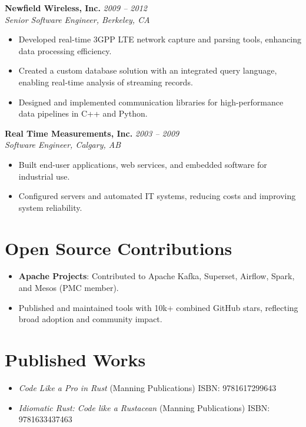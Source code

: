 \documentclass[margin,line]{resume}
\begin{document}
\begin{resume}
\textbf{Newfield Wireless, Inc.} \hfill \textit{2009 -- 2012} \\
\textit{Senior Software Engineer, Berkeley, CA}
\begin{itemize}[leftmargin=0.5cm]
    \item Developed real-time 3GPP LTE network capture and parsing tools, enhancing data processing efficiency.
    \item Created a custom database solution with an integrated query language, enabling real-time analysis of streaming records.
    \item Designed and implemented communication libraries for high-performance data pipelines in C++ and Python.
\end{itemize}

\textbf{Real Time Measurements, Inc.} \hfill \textit{2003 -- 2009} \\
\textit{Software Engineer, Calgary, AB}
\begin{itemize}[leftmargin=0.5cm]
    \item Built end-user applications, web services, and embedded software for industrial use.
    \item Configured servers and automated IT systems, reducing costs and improving system reliability.
\end{itemize}

\vspace{10pt}

\section{Open Source Contributions}
\begin{itemize}[leftmargin=0.5cm]
\item \textbf{Apache Projects}: Contributed to Apache Kafka, Superset, Airflow, Spark, and Mesos (PMC member).
\item Published and maintained tools with 10k+ combined GitHub stars, reflecting broad adoption and community impact.
\end{itemize}

\vspace{10pt}

\section{Published Works}
\begin{itemize}[leftmargin=0.5cm]
\item \textit{Code Like a Pro in Rust} (Manning Publications) \hfill ISBN: 9781617299643  
\item \textit{Idiomatic Rust: Code like a Rustacean} (Manning Publications) \hfill ISBN: 9781633437463  
\end{itemize}


\end{resume}
\end{document}

